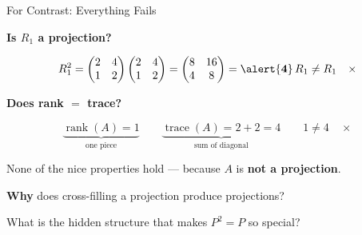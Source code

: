 \documentclass[10pt]{beamer}
\theoremstyle{definition}
\newcommand{\x}[1]{\alert{\textbf{#1}}}
\begin{document}
\begin{frame}{For Contrast: Everything Fails}

\x{Is $R_1$ a projection?}

$$R_1^2 = \begin{pmatrix} 2 & 4 \\ 1 & 2 \end{pmatrix} \begin{pmatrix} 2 & 4 \\ 1 & 2 \end{pmatrix} = \begin{pmatrix} 8 & 16 \\ 4 & 8 \end{pmatrix} = \x{4}\,R_1 \neq R_1 \quad \times$$

\vspace{0.5em}

\x{Does rank $=$ trace?}

$$\underbrace{\operatorname{rank}(A) = 1}_{\text{one piece}} \qquad \underbrace{\operatorname{trace}(A) = 2 + 2 = 4}_{\text{sum of diagonal}} \qquad 1 \neq 4 \quad \times$$

\vspace{0.5em}

None of the nice properties hold --- because $A$ is \x{not a projection}.

\end{frame}

\begin{frame}{}

\vspace{3em}

\begin{center}
{\Large \x{Why} does cross-filling a projection produce projections?}

\vspace{2em}

{\small What is the hidden structure that makes $P^2 = P$ so special?}
\end{center}

\end{frame}
\end{document}
